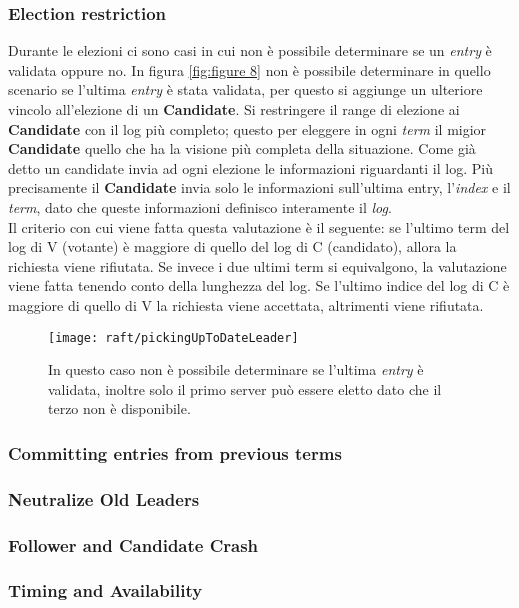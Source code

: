   \subsubsection{Election restriction}
  	Durante le elezioni ci sono casi in cui non è possibile determinare se un \textit{entry} è validata oppure no.
  	In figura \ref{fig:figure 8} non è possibile determinare in quello scenario se l'ultima \textit{entry} è stata validata, per questo si aggiunge un ulteriore vincolo all'elezione di un \textbf{Candidate}.
  	Si restringere il range di elezione ai \textbf{Candidate} con il log più completo; questo per eleggere in ogni \textit{term} il migior \textbf{Candidate} quello che ha la visione più completa della situazione. 
  	Come già detto un candidate invia ad ogni elezione le informazioni riguardanti il log.
  	Più precisamente il \textbf{Candidate} invia solo le informazioni sull'ultima entry, l'\textit{index} e il \textit{term}, dato che queste informazioni definisco interamente il \textit{log}.
  	\\
  	Il criterio con cui viene fatta questa valutazione è il seguente: se l'ultimo term del log di V (votante) è maggiore di quello del log di C (candidato), allora la  richiesta viene rifiutata. Se invece i due ultimi term si equivalgono, la valutazione viene fatta tenendo conto della lunghezza del log. Se l'ultimo indice del log di C è maggiore di quello di V la richiesta viene accettata, altrimenti viene rifiutata.
  	
  \begin{figure}[H]
  	\centering
  	\texttt{[image: raft/pickingUpToDateLeader]}
  	\captionsetup{singlelinecheck=off}
  	\caption[stateDiagramCaption]{
	In questo caso non è possibile determinare se l'ultima \textit{entry} è validata, inoltre solo il primo server può essere eletto dato che il terzo non è disponibile.}
  	\label{fig:figure8}
  \end{figure}
  \subsubsection{Committing entries from previous terms}
  \subsubsection{Neutralize Old Leaders}
  \subsubsection{Follower and Candidate Crash}
  \subsubsection{Timing and Availability}